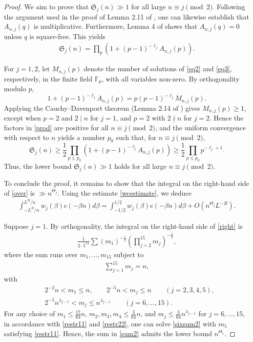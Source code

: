 \documentclass{article}
\theoremstyle{plain}
\begin{document}
\begin{proof}
    We aim to prove that $ \mathfrak{S}_j(n) \gg 1$ for all large $n\equiv j \pmod 2$. Following the argument used in the proof of Lemma 2.11 of \cite{bookVau}, one can likewise establish that $A_{n,j}(q)$ is multiplicative. Furthermore, Lemma 4 of \cite{Hua38} shows that $A_{n,j}(q) = 0$ unless $q$ is square-free. This yields
    \begin{align}\label{prod}
        \mathfrak{S}_j(n) = \prod \limits_{p}(1+(p-1)^{-\ell_j}A_{n,j}(p)).
    \end{align}


    For $j=1,2$, let $M_{n,j}(p)$ denote the number of solutions of \eqref{eq2} and \eqref{eq3}, respectively, in the finite field $\mathbb{F}_p$, with all variables non-zero. By orthogonality modulo $p$, 
$$1 + (p-1)^{-\ell_j} A_{n,j}(p)= p(p-1)^{-\ell_j}M_{n,j}(p).$$
Applying the Cauchy–Davenport theorem (Lemma 2.14 of \cite{bookVau}) gives $M_{n,j}(p) \geq 1$, except when  $p=2$ and $2 \mid n$ for $j=1$, and $p=2$ with $2 \nmid n$ for $j=2$. Hence the factors in \eqref{prod} are positive for all $n\equiv j \pmod 2$, and the uniform convergence with respect to $n$ yields a number $p_0$ such that, for $n\equiv j \pmod 2$,
$$\mathfrak{S}_j(n) \geq \frac{1}{2} \prod \limits_{p\leq p_0}(1+(p-1)^{-\ell_j}A_{n,j}(p)) \geq \frac{1}{2} \prod \limits_{p\leq p_0}p^{-\ell_j+1}.$$
Thus, the lower bound $ \mathfrak{S}_j(n) \gg 1$ holds for all large $n\equiv j \pmod 2$.

To conclude the proof, it remains to show that the integral on the right-hand side of \eqref{over} is $\gg n^{\Theta_j}$. Using the estimate \eqref{wcestimate}, we deduce 
\begin{align}\label{right}
     \int_{-L^B/n}^{L^B/n} w_j(\beta)e(-\beta n)d\beta = \int_{-1/2}^{1/2} w_j(\beta)e(-\beta n)d\beta + O(n^{\Theta_j}L^{-B}).
\end{align}

Suppose $j=1$. By orthogonality, the integral on the right-hand side of \eqref{right} is 
\begin{align}\label{sum2}
    \frac{1}{2\cdot 5^{14}} \sum (m_1)^{-\frac{1}{2}}\left(\prod_{j=2}^{15}m_j\right)^{-\frac{4}{5}},
\end{align}
where the sum runs over $m_1,\dots,m_{15}$ subject to 
\begin{align}\label{sixsum2}
   \sum_{j=1}^{15} m_j=n,
\end{align}
with
 \begin{align}
    & 2^{-2}n<m_1 \leq n, \qquad 2^{-5}n<m_j \leq n \qquad (j=2,3,4,5), \label{restr11}\\
    &2^{-5}n^{\lambda_{j-5}}<m_j\leq n^{\lambda_{j-5}} \qquad (j=6,\dots,15). \label{restr22}
\end{align}
For any choice of $m_1 \leq \tfrac{17}{64}n$, $m_2,m_3,m_4 \leq \tfrac{3}{64}n$, and  $m_j \leq \tfrac{3}{64}n^{\lambda_{j-5}}$ for $j=6,\dots,15$, in accordance with \eqref{restr11} and \eqref{restr22}, one can solve \eqref{sixsum2} with $m_5$ satisfying \eqref{restr11}. Hence, the sum in \eqref{sum2} admits the lower bound $n^{\Theta_1}$.


\end{proof}
\end{document}
